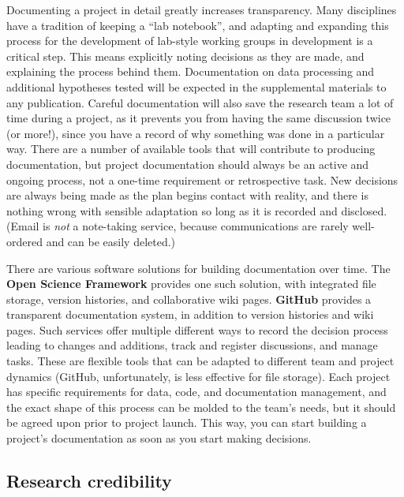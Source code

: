 Documenting a project in detail greatly increases transparency.
Many disciplines have a tradition of keeping a ``lab notebook'',
and adapting and expanding this process for the development
of lab-style working groups in development is a critical step.
This means explicitly noting decisions as they are made, and explaining the process behind them.
Documentation on data processing and additional hypotheses tested
will be expected in the supplemental materials to any publication.
Careful documentation will also save the research team a lot of time during a project,
as it prevents you from having the same discussion twice (or more!),
since you have a record of why something was done in a particular way.
There are a number of available tools
that will contribute to producing documentation,
but project documentation should always be an active and ongoing process,
not a one-time requirement or retrospective task.
New decisions are always being made as the plan begins contact with reality,
and there is nothing wrong with sensible adaptation so long as it is recorded and disclosed.
(Email is \textit{not} a note-taking service, because communications are rarely well-ordered and can be easily deleted.)

There are various software solutions for building documentation over time.
The \textbf{Open Science Framework} provides one such solution,
with integrated file storage, version histories, and collaborative wiki pages.
\textbf{GitHub} provides a transparent documentation system,
in addition to version histories and wiki pages.
Such services offer multiple different ways to record the decision process leading to changes and additions,
track and register discussions, and manage tasks.
These are flexible tools that can be adapted to different team and project dynamics (GitHub, unfortunately, is less effective for file storage).
Each project has specific requirements for data, code, and documentation management,
and the exact shape of this process can be molded to the team's needs,
but it should be agreed upon prior to project launch.
This way, you can start building a project's documentation as soon as you start making decisions.

\subsection{Research credibility}

